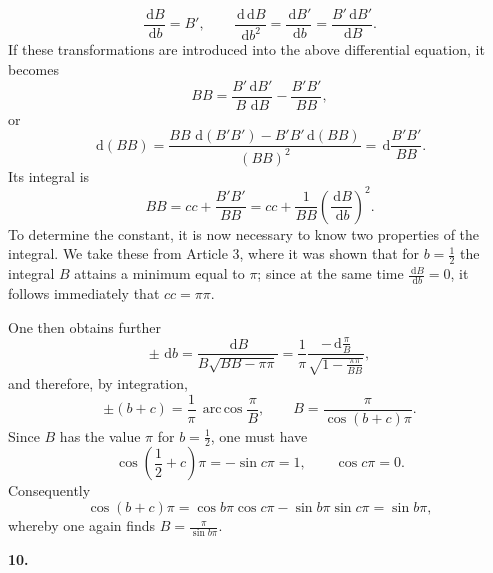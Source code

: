\documentclass[11pt]{article}
\newcommand{\dd}{\,\mathrm d}
\newcommand{\arccosop}{\operatorname{arc\,cos}}
\newcommand{\art}[1]{\bigskip\begin{center}\large\bfseries #1.\end{center}\nopagebreak}
\begin{document}
\[
\frac{\dd B}{\dd b}=B',\qquad
\frac{\dd\dd B}{\dd b^2}=\frac{\dd B'}{\dd b}
=\frac{B'\dd B'}{\dd B}.
\]
If these transformations are introduced into the above differential equation, it becomes
\[
B B=\frac{B'\dd B'}{B\,\dd B}-\frac{B'B'}{B B},
\]
or
\[
\dd(BB)=
\frac{BB\,\dd(B'B')-B'B'\dd(BB)}{(BB)^2}
=\dd\frac{B'B'}{BB}.
\]
Its integral is
\[
BB=cc+\frac{B'B'}{BB}
=cc+\frac1{BB}\left(\frac{\dd B}{\dd b}\right)^2.
\]
To determine the constant, it is now necessary to know two properties of the integral. We take these from Article 3, where it was shown that for $b=\frac12$ the integral $B$ attains a minimum equal to $\pi$; since at the same time $\frac{\dd B}{\dd b}=0$, it follows immediately that $cc=\pi\pi$.

One then obtains further
\[
\pm\,\dd b=
\frac{\dd B}{B\sqrt{BB-\pi\pi}}
=\frac1\pi
  \frac{-\dd\frac{\pi}{B}}
       {\sqrt{1-\frac{\pi\pi}{BB}}},
\]
and therefore, by integration,
\[
\pm(b+c)=\frac1\pi\,\arccosop\frac{\pi}{B},
\qquad
B=\frac{\pi}{\cos(b+c)\pi}.
\]
Since $B$ has the value $\pi$ for $b=\frac12$, one must have
\[
\cos\left(\frac12+c\right)\pi=-\sin c\pi=1,
\qquad \cos c\pi=0.
\]
Consequently
\[
\cos(b+c)\pi=\cos b\pi\cos c\pi-\sin b\pi\sin c\pi=\sin b\pi,
\]
whereby one again finds $B=\frac{\pi}{\sin b\pi}$.

\art{10}
\end{document}
